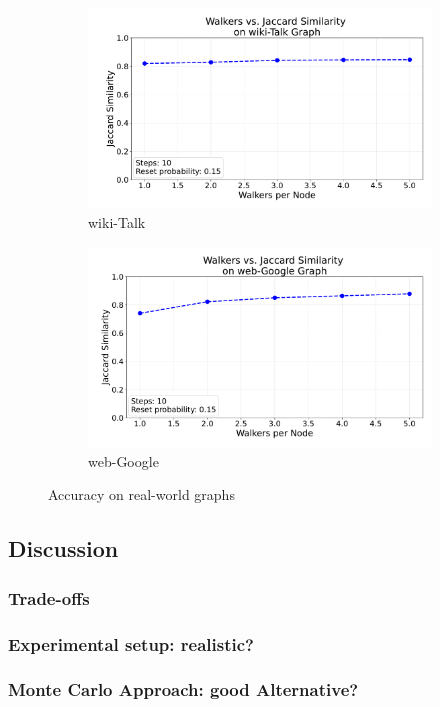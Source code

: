 \begin{figure}[H]
    \centering
    \begin{subfigure}[t]{0.5\linewidth}
        \centering
        \includegraphics[width=\linewidth]{images/plots/wiki-Talk/accuracy_plots_wiki_talk.pdf}
        \caption{wiki-Talk}
        \label{fig:wikirun}
    \end{subfigure}\hfill
    \begin{subfigure}[t]{0.5\linewidth}
        \centering
        \includegraphics[width=\linewidth]{images/plots/web-Google/accuracy_plots_web_google.pdf}
        \caption{web-Google}
        \label{fig:wikigibhrs}
    \end{subfigure}
    \caption{Accuracy on real-world graphs}
    \label{fig:wiki-comparison}
\end{figure}








\subsection{Discussion}
\subsubsection{Trade-offs}
\subsubsection{Experimental setup: realistic?}
\subsubsection{Monte Carlo Approach: good Alternative?}
